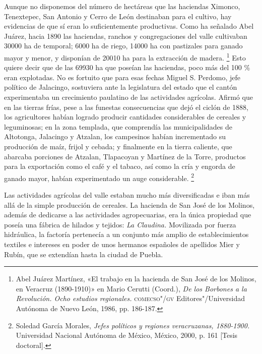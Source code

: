 \documentclass[14pt,twoside,final]{extbook} %
\let\oldfootnote\footnote
\renewcommand\footnote[1]{%
\oldfootnote{\hspace{1mm}#1}}
\begin{document}
Aunque no disponemos del número de hectáreas que las haciendas Ximonco, Tenextepec, San Antonio y Cerro de León destinaban para el cultivo, hay evidencias de que sí eran lo suficientemente productivas. Como ha señalado Abel Juárez, hacia 1890 las haciendas, ranchos y congregaciones del valle cultivaban 30000 ha de temporal; 6000 ha de riego, 14000 ha con pastizales para ganado mayor y menor, y disponían de 20010 ha para la extracción de madera.\footnote{Abel Juárez Martínez, «El trabajo en la hacienda de San José de los Molinos, en Veracruz (\mbox{1890-1910})» en Mario Cerutti (Coord.), \emph{De los Borbones a la Revolución. Ocho estudios regionales.} \textsc{comecso"/gv} Editores"/Universidad Autónoma de Nuevo León, 1986, pp. 186-187.} Esto quiere decir que de las 69930 ha que poseían las haciendas, poco más del 100 \% eran explotadas. No es fortuito que para esas fechas Miguel S. Perdomo, jefe político de Jalacingo, sostuviera ante la legislatura del estado que el cantón experimentaba un crecimiento paulatino de las actividades agrícolas. Afirmó que en las tierras frías, pese a las funestas consecuencias que dejó el ciclón de 1888, los agricultores habían logrado producir cantidades considerables de cereales y leguminosas; en la zona templada, que comprendía las municipalidades de Altotonga, Jalacingo y Atzalan, los campesinos habían incrementado su producción de maíz, frijol y cebada; y finalmente en la tierra caliente, que abarcaba porciones de Atzalan, Tlapacoyan y Martínez de la Torre, productos para la exportación como el café y el tabaco, así como la cría y engorda de ganado mayor, habían experimentado un auge considerable.\footnote{Soledad García Morales, \emph{Jefes políticos y regiones veracruzanas, 1880-1900.} Universidad Nacional Autónoma de México, México, 2000, p. 161 [Tesis doctoral].}

Las actividades agrícolas del valle estaban mucho más diversificadas e iban más allá de la simple producción de cereales. La hacienda de San José de los Molinos, además de dedicarse a las actividades agropecuarias, era la única propiedad que poseía una fábrica de hilados y tejidos: \emph{La Claudina.} Movilizada por fuerza hidráulica, la factoría pertenecía a un conjunto más amplio de establecimientos textiles e intereses en poder de unos hermanos españoles de apellidos Mier y Rubín, que se extendían hasta la ciudad de Puebla.
\end{document}
